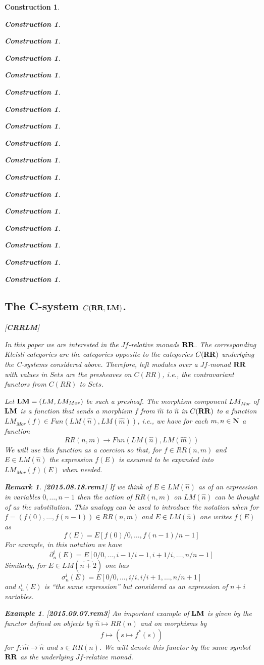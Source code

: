 \documentclass[12pt]{amsart}
\newtheorem{example}[proposition]{Example}
\newtheorem{remark}[proposition]{Remark}
\newtheorem{construction}[proposition]{Construction}
\newcommand{\llabel}[1]{\label{#1}[{\bf #1}]}
\newcommand{\sr}{\rightarrow}
\newcommand{\nn}{{\bf N\rm}}
\newcommand{\nat}{\nn}
\newcommand{\wh}{\widehat}
\newcommand{\mbind}[1]{{#1^*}}
\newcommand{\RR}{{\bf RR}}
\newcommand{\LM}{{\bf LM}}
\begin{document}
\begin{construction}
\begin{construction}
\begin{construction}
\begin{construction}
\begin{construction}
\begin{construction}
\begin{construction}
\begin{construction}
\begin{construction}
\begin{construction}
\begin{construction}
\begin{construction}
\begin{construction}
\begin{construction}
\begin{construction}
\begin{construction}
\begin{construction}
\subsection{The C-system $C(\RR,\LM)$.}
%
\llabel{CRRLM}

In this paper we are interested in the $Jf$-relative monads $\RR$. The corresponding Kleisli categories are the categories opposite to the categories $C(\RR)$ underlying the C-systems considered above. Therefore, left modules over a $Jf$-monad $\RR$ with values in $Sets$ are the presheaves on $C(RR)$, i.e., the contravariant functors from $C(RR)$ to $Sets$. 

Let $\LM=(LM,LM_{Mor})$ be such a presheaf.
%
%
The morphism component $LM_{Mor}$ of $\LM$ is a function that sends a morphism $f$ from $\wh{m}$ to $\wh{n}$ in $C(\RR)$ to a function $LM_{Mor}(f)\in Fun(LM(\wh{n}),LM(\wh{m}))$, i.e., we have for each $m,n\in\nat$ a function
%
$$RR(n,m)\sr Fun(LM(\wh{n}),LM(\wh{m}))$$
%
%
We will use this function as a coercion so that, for $f\in RR(n,m)$ and $E\in LM(\wh{n})$ the expression $f(E)$ is assumed to be expanded into $LM_{Mor}(f)(E)$ when needed. 
%
\begin{remark}\rm
\llabel{2015.08.18.rem1}
If we think of $E\in LM(\wh{n})$ as of an expression in variables $0,\dots,n-1$ then the action of $RR(n,m)$ on $LM(\wh{n})$ can be thought of as the substitution. This analogy can be used to introduce the notation when for $f=(f(0),\dots,f(n-1))\in RR(n,m)$ and $E\in LM(\wh{n})$ one writes $f(E)$ as 
%
$$f(E)=E[f(0)/0,\dots,f(n-1)/n-1]$$
%
For example, in this notation we have 
%
$$\partial^i_n(E)=E[0/0,\dots,i-1/i-1,i+1/i,\dots,n/n-1]$$
%
Similarly, for $E\in LM(\wh{n+2})$ one has
%
$$\sigma^i_n(E)=E[0/0,\dots,i/i,i/i+1,\dots,n/n+1]$$
%
and $\iota_n^i(E)$ is ``the same expression'' but considered as an expression of $n+i$ variables.
\end{remark}
%
\begin{example}\rm
\llabel{2015.09.07.rem3}
An important example of $\LM$ is given by the functor defined on objects by $\wh{n}\mapsto RR(n)$ and on morphisms by 
%
$$f\mapsto (s\mapsto\mbind{f}(s))$$
%
for $f:\wh{m}\sr \wh{n}$ and $s\in RR(n)$. We will denote this functor by the same symbol $\RR$ as the underlying $Jf$-relative monad. 


\end{example}
\end{construction}
\end{construction}
\end{construction}
\end{construction}
\end{construction}
\end{construction}
\end{construction}
\end{construction}
\end{construction}
\end{construction}
\end{construction}
\end{construction}
\end{construction}
\end{construction}
\end{construction}
\end{construction}
\end{construction}
\end{document}
